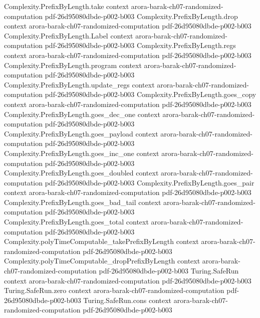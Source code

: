 \begin{theorem}
\proofstep
  {Complexity.PrefixByLength.take}
  {context}
  {arora-barak-ch07-randomized-computation}
  {pdf-26d95080dbde-p002-b003}
\proofstep
  {Complexity.PrefixByLength.drop}
  {context}
  {arora-barak-ch07-randomized-computation}
  {pdf-26d95080dbde-p002-b003}
\proofstep
  {Complexity.PrefixByLength.Label}
  {context}
  {arora-barak-ch07-randomized-computation}
  {pdf-26d95080dbde-p002-b003}
\proofstep
  {Complexity.PrefixByLength.regs}
  {context}
  {arora-barak-ch07-randomized-computation}
  {pdf-26d95080dbde-p002-b003}
\proofstep
  {Complexity.PrefixByLength.program}
  {context}
  {arora-barak-ch07-randomized-computation}
  {pdf-26d95080dbde-p002-b003}
\proofstep
  {Complexity.PrefixByLength.update_regs}
  {context}
  {arora-barak-ch07-randomized-computation}
  {pdf-26d95080dbde-p002-b003}
\proofstep
  {Complexity.PrefixByLength.goes_copy}
  {context}
  {arora-barak-ch07-randomized-computation}
  {pdf-26d95080dbde-p002-b003}
\proofstep
  {Complexity.PrefixByLength.goes_dec_one}
  {context}
  {arora-barak-ch07-randomized-computation}
  {pdf-26d95080dbde-p002-b003}
\proofstep
  {Complexity.PrefixByLength.goes_payload}
  {context}
  {arora-barak-ch07-randomized-computation}
  {pdf-26d95080dbde-p002-b003}
\proofstep
  {Complexity.PrefixByLength.goes_inc_one}
  {context}
  {arora-barak-ch07-randomized-computation}
  {pdf-26d95080dbde-p002-b003}
\proofstep
  {Complexity.PrefixByLength.goes_doubled}
  {context}
  {arora-barak-ch07-randomized-computation}
  {pdf-26d95080dbde-p002-b003}
\proofstep
  {Complexity.PrefixByLength.goes_pair}
  {context}
  {arora-barak-ch07-randomized-computation}
  {pdf-26d95080dbde-p002-b003}
\proofstep
  {Complexity.PrefixByLength.goes_bad_tail}
  {context}
  {arora-barak-ch07-randomized-computation}
  {pdf-26d95080dbde-p002-b003}
\proofstep
  {Complexity.PrefixByLength.goes_total}
  {context}
  {arora-barak-ch07-randomized-computation}
  {pdf-26d95080dbde-p002-b003}
\proofstep
  {Complexity.polyTimeComputable_takePrefixByLength}
  {context}
  {arora-barak-ch07-randomized-computation}
  {pdf-26d95080dbde-p002-b003}
\proofstep
  {Complexity.polyTimeComputable_dropPrefixByLength}
  {context}
  {arora-barak-ch07-randomized-computation}
  {pdf-26d95080dbde-p002-b003}
\proofstep
  {Turing.SafeRun}
  {context}
  {arora-barak-ch07-randomized-computation}
  {pdf-26d95080dbde-p002-b003}
\proofstep
  {Turing.SafeRun.zero}
  {context}
  {arora-barak-ch07-randomized-computation}
  {pdf-26d95080dbde-p002-b003}
\proofstep
  {Turing.SafeRun.cons}
  {context}
  {arora-barak-ch07-randomized-computation}
  {pdf-26d95080dbde-p002-b003}
\proofstep

\end{theorem}
